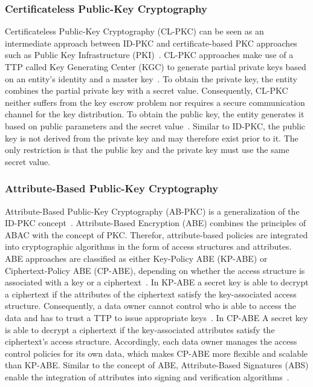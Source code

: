 \subsubsection{Certificateless Public-Key Cryptography}
Certificateless Public-Key Cryptography (CL-PKC) can be seen as an intermediate approach between ID-PKC and certificate-based PKC approaches such as Public Key Infrastructure (PKI)~\cite{AlRiyami2003}.
CL-PKC approaches make use of a TTP called Key Generating Center (KGC) to generate partial private keys based on an entity's identity and a master key~\cite{AlRiyami2003}.
To obtain the private key, the entity combines the partial private key with a secret value.
Consequently, CL-PKC neither suffers from the key escrow problem nor requires a secure communication channel for the key distribution.
To obtain the public key, the entity generates it based on public parameters and the secret value~\cite{AlRiyami2003}.
Similar to ID-PKC, the public key is not derived from the private key and may therefore exist prior to it.
The only restriction is that the public key and the private key must use the same secret value.

\subsubsection{Attribute-Based Public-Key Cryptography}
Attribute-Based Public-Key Cryptography (AB-PKC) is a generalization of the ID-PKC concept~\cite{Sahai2005,Goyal2006,Hu2023}.
Attribute-Based Encryption (ABE) combines the principles of ABAC with the concept of PKC.
Therefor, attribute-based policies are integrated into cryptographic algorithms in the form of access structures and attributes.
ABE approaches are classified as either Key-Policy ABE (KP-ABE) or Ciphertext-Policy ABE (CP-ABE), depending on whether the access structure is associated with a key or a ciphertext~\cite{Goyal2006,Bethencourt2007,Hu2023}.
In KP-ABE a secret key is able to decrypt a ciphertext if the attributes of the ciphertext satisfy the key-associated access structure.
Consequently, a data owner cannot control who is able to access the data and has to trust a TTP to issue appropriate keys~\cite{Bethencourt2007}.
In CP-ABE A secret key is able to decrypt a ciphertext if the key-associated attributes satisfy the ciphertext's access structure.
Accordingly, each data owner manages the access control policies for its own data, which makes CP-ABE more flexible and scalable than KP-ABE.
Similar to the concept of ABE, Attribute-Based Signatures (ABS) enable the integration of attributes into signing and verification algorithms~\cite{Li2010,Maji2011}.
